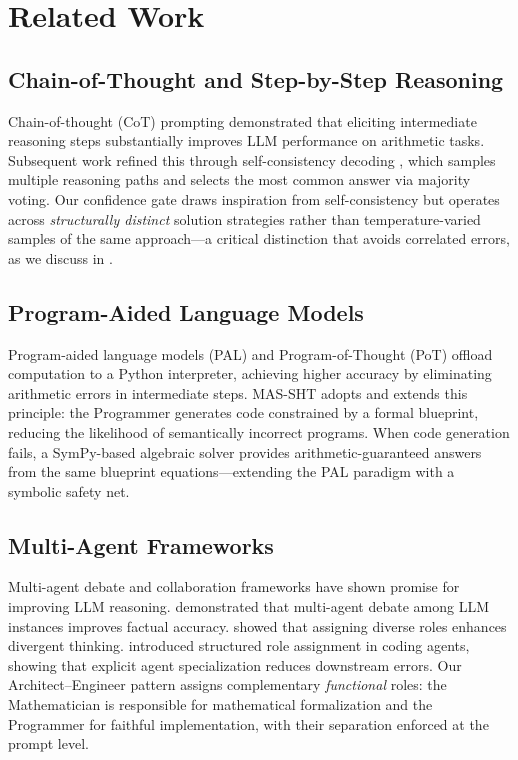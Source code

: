 \documentclass[11pt,a4paper]{article}
\begin{document}
\section{Related Work}
\label{sec:related}
\subsection{Chain-of-Thought and Step-by-Step Reasoning}
Chain-of-thought (CoT) prompting \citep{wei2022chain} demonstrated that eliciting intermediate reasoning steps substantially improves LLM performance on arithmetic tasks.
Subsequent work refined this through self-consistency decoding \citep{wang2023selfconsistency}, which samples multiple reasoning paths and selects the most common answer via majority voting.
Our confidence gate draws inspiration from self-consistency but operates across \emph{structurally distinct} solution strategies rather than temperature-varied samples of the same approach---a critical distinction that avoids correlated errors, as we discuss in .
\subsection{Program-Aided Language Models}
Program-aided language models (PAL) \citep{gao2023pal} and Program-of-Thought (PoT) \citep{chen2023program} offload computation to a Python interpreter, achieving higher accuracy by eliminating arithmetic errors in intermediate steps.
MAS-SHT adopts and extends this principle: the Programmer generates code constrained by a formal blueprint, reducing the likelihood of semantically incorrect programs.
When code generation fails, a SymPy-based algebraic solver provides arithmetic-guaranteed answers from the same blueprint equations---extending the PAL paradigm with a symbolic safety net.
\subsection{Multi-Agent Frameworks}
Multi-agent debate and collaboration frameworks have shown promise for improving LLM reasoning.
\citet{du2023improving} demonstrated that multi-agent debate among LLM instances improves factual accuracy.
\citet{liang2023encouraging} showed that assigning diverse roles enhances divergent thinking.
\citet{hong2023metagpt} introduced structured role assignment in coding agents, showing that explicit agent specialization reduces downstream errors.
Our Architect--Engineer pattern assigns complementary \emph{functional} roles: the Mathematician is responsible for mathematical formalization and the Programmer for faithful implementation, with their separation enforced at the prompt level.
\end{document}
